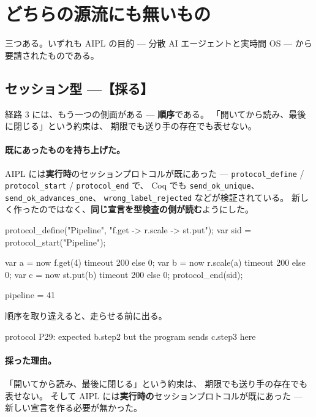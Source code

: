 \documentclass[11pt,a4paper]{ltjsarticle}
\theoremstyle{definition}
\theoremstyle{remark}
\begin{document}
\section{どちらの源流にも無いもの}
\label{sec:orig}

三つある。いずれも AIPL の目的 --- 分散 AI エージェントと実時間 OS ---
から要請されたものである。

\subsection{セッション型 ---【採る】}

\label{sec:session}

経路 3 には、もう一つの側面がある --- \textbf{順序}である。
「開いてから読み、最後に閉じる」という約束は、
期限でも送り手の存在でも表せない。

\paragraph{既にあったものを持ち上げた。}
AIPL には\textbf{実行時}のセッションプロトコルが既にあった ---
\texttt{protocol\_define} / \texttt{protocol\_start} / \texttt{protocol\_end} で、
Coq でも \texttt{send\_ok\_unique}、\texttt{send\_ok\_advances\_one}、
\texttt{wrong\_label\_rejected} などが検証されている。
新しく作ったのではなく、\textbf{同じ宣言を型検査の側が読む}ようにした。

\begin{aipl}
protocol_define("Pipeline", "f.get -> r.scale -> st.put");
var sid = protocol_start("Pipeline");

var a = now f.get(4)    timeout 200 else 0;
var b = now r.scale(a)  timeout 200 else 0;
var c = now st.put(b)   timeout 200 else 0;
protocol_end(sid);
\end{aipl}
\begin{term}
pipeline = 41
\end{term}

順序を取り違えると、走らせる前に出る。

\begin{term}
 protocol P29: expected b.step2 but the program sends c.step3 here
\end{term}

\paragraph{採った理由。}
「開いてから読み、最後に閉じる」という約束は、
期限でも送り手の存在でも表せない。
そして AIPL には\textbf{実行時の}セッションプロトコルが既にあった ---
新しい宣言を作る必要が無かった。
\end{document}
